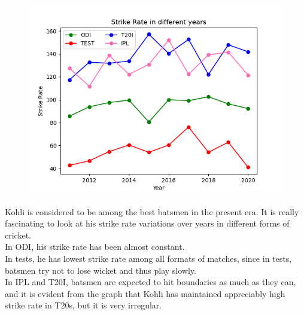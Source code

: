 \documentclass[12pt]{article}
\begin{document}
\begin{figure}[h]
\begin{center}
\includegraphics[width=1\linewidth]{assign/Group_line.png}
\end{center}
\end{figure}
     Kohli is considered to be among the best batsmen in the present era. It is really fascinating to look at his strike rate variations over years in different forms of cricket.\\ In ODI, his strike rate has been almost constant.\\ In tests, he has lowest strike rate among all formats of matches, since in tests, batsmen try not to lose wicket and thus play slowly.\\ In IPL and T20I, batsmen are expected to hit boundaries as much as they can, and it is evident from the graph that Kohli has maintained appreciably high strike rate in T20s, but it is very irregular.
\newpage

    
    
\end{document}
